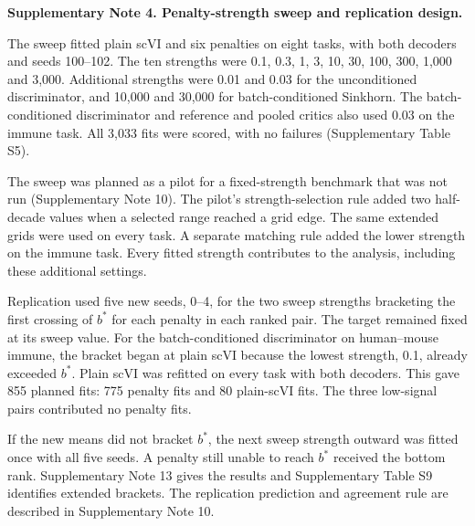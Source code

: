 \medskip\noindent\textbf{Supplementary Note 4. Penalty-strength sweep and replication design.}\par\smallskip
\begingroup\small\setlength{\parskip}{3pt}
The sweep fitted plain scVI and six penalties on eight tasks, with both decoders and seeds 100--102. The ten strengths were 0.1, 0.3, 1, 3, 10, 30, 100, 300, 1,000 and 3,000. Additional strengths were 0.01 and 0.03 for the unconditioned discriminator, and 10,000 and 30,000 for batch-conditioned Sinkhorn. The batch-conditioned discriminator and reference and pooled critics also used 0.03 on the immune task. All 3,033 fits were scored, with no failures (Supplementary Table S5).

The sweep was planned as a pilot for a fixed-strength benchmark that was not run (Supplementary Note 10). The pilot's strength-selection rule added two half-decade values when a selected range reached a grid edge. The same extended grids were used on every task. A separate matching rule added the lower strength on the immune task. Every fitted strength contributes to the analysis, including these additional settings.

Replication used five new seeds, 0--4, for the two sweep strengths bracketing the first crossing of $b^*$ for each penalty in each ranked pair. The target remained fixed at its sweep value. For the batch-conditioned discriminator on human--mouse immune, the bracket began at plain scVI because the lowest strength, 0.1, already exceeded $b^*$. Plain scVI was refitted on every task with both decoders. This gave 855 planned fits: 775 penalty fits and 80 plain-scVI fits. The three low-signal pairs contributed no penalty fits.

If the new means did not bracket $b^*$, the next sweep strength outward was fitted once with all five seeds. A penalty still unable to reach $b^*$ received the bottom rank. Supplementary Note 13 gives the results and Supplementary Table S9 identifies extended brackets. The replication prediction and agreement rule are described in Supplementary Note 10.
\par\endgroup
